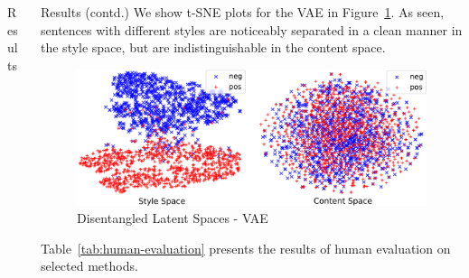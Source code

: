 \documentclass[final]{beamer}
\newlength{\onecolwid}
\newlength{\twocolwid}
\begin{document}
\begin{frame}[t]
\begin{columns}[t]
\begin{column}{\twocolwid}
\begin{columns}[t,totalwidth=\twocolwid]
\begin{column}{\onecolwid}
\begin{block}{Results}
                    \end{block}


                \end{column} %

                \begin{column}{\onecolwid} %


                    \begin{block}{Results (contd.)}
                        We show t-SNE plots for the VAE in Figure~\ref{fig:tsne-plot}.
                        As seen, sentences with different styles are noticeably separated in a clean manner in the style space, but are indistinguishable in the content space.
                        \begin{figure}
                            \includegraphics[width=\linewidth]{vae-latent-spaces}
                            \caption{Disentangled Latent Spaces - VAE}
                            \label{fig:tsne-plot}
                        \end{figure}

                        Table~\ref{tab:human-evaluation} presents the results of human evaluation on selected methods.


\end{block}
\end{column}
\end{columns}
\end{column}
\end{columns}
\end{frame}
\end{document}
